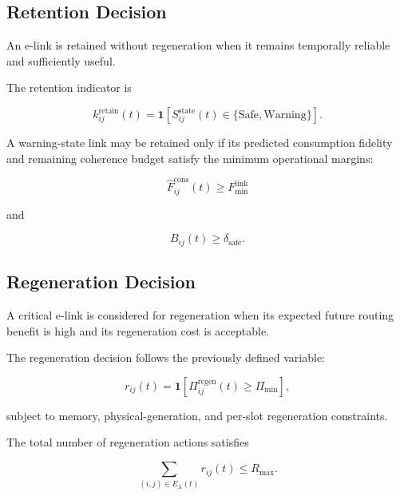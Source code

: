 \subsection{Retention Decision}

An e-link is retained without regeneration when it remains temporally reliable and sufficiently useful.

The retention indicator is

\begin{equation}
    k_{ij}^{\mathrm{retain}}(t)
    =
    \mathbf{1}
    \left[
    S_{ij}^{\mathrm{state}}(t)
    \in
    \{
    \mathrm{Safe},
    \mathrm{Warning}
    \}
    \right].
\end{equation}

A warning-state link may be retained only if its predicted consumption fidelity and remaining coherence budget satisfy the minimum operational margins:

\begin{equation}
    \widehat{F}_{ij}^{\mathrm{cons}}(t)
    \geq
    F_{\min}^{\mathrm{link}}
\end{equation}

and

\begin{equation}
    B_{ij}(t)
    \geq
    \delta_{\mathrm{safe}}.
\end{equation}


\subsection{Regeneration Decision}

A critical e-link is considered for regeneration when its expected future routing benefit is high and its regeneration cost is acceptable.

The regeneration decision follows the previously defined variable:

\begin{equation}
    r_{ij}(t)
    =
    \mathbf{1}
    \left[
    \Pi_{ij}^{\mathrm{regen}}(t)
    \geq
    \Pi_{\min}
    \right],
\end{equation}

subject to memory, physical-generation, and per-slot regeneration constraints.

The total number of regeneration actions satisfies

\begin{equation}
    \sum_{(i,j)\in E_{\mathrm{A}}(t)}
    r_{ij}(t)
    \leq
    R_{\max}.
\end{equation}


